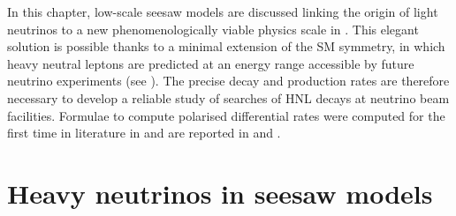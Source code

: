 In this chapter, low-scale seesaw models are discussed linking the origin of light neutrinos to %
a new phenomenologically viable physics scale in .
This elegant solution is possible thanks to a minimal extension of the SM symmetry, %
in which heavy neutral leptons are predicted at an energy range accessible by future neutrino experiments (see ).
The precise decay and production rates are therefore necessary %
to develop a reliable study of searches of HNL decays at neutrino beam facilities.
Formulae to compute polarised differential rates were computed for the first time in literature %
in  and are reported in  and .

\section{Heavy neutrinos in seesaw models}
\label{sec:model}

